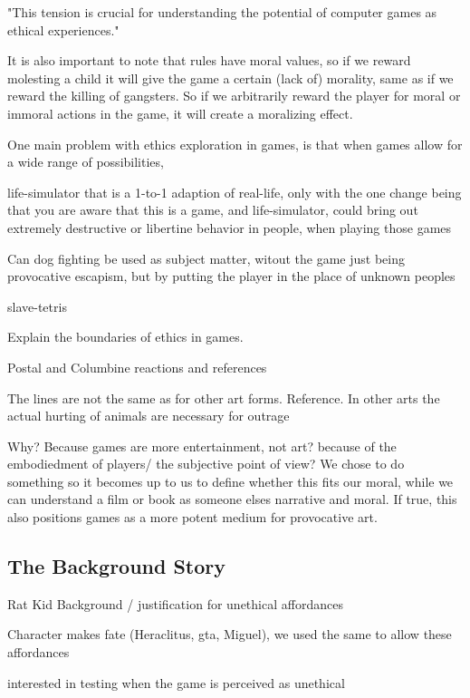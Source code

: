 "This tension is crucial for understanding the potential of computer games as ethical experiences."
\

It is also important to note that rules have moral values, so if we reward molesting a child it will give the game a certain (lack of) morality, same as if we reward the killing of gangsters. So if we arbitrarily reward the player for moral or immoral actions in the game, it will create a moralizing effect.\

One main problem with ethics exploration in games, is that when games allow for a wide range of possibilities,

life-simulator that is a 1-to-1 adaption of real-life, only with the one change being that you are aware that this is a game, and 
life-simulator, could bring out extremely destructive or libertine behavior in people, when playing those games




Can dog fighting be used as subject matter, witout the game just being provocative escapism, but by putting the player in the place of unknown peoples


slave-tetris

Explain the boundaries of ethics in games. \

Postal and Columbine reactions and references\

The lines are not the same as for other art forms. Reference. In other arts the actual hurting of animals are necessary for outrage\

Why? Because games are more entertainment, not art? because of the embodiedment of players/ the subjective point of view? We chose to do something so it becomes up to us to define whether this fits our moral, while we can understand a film or book as someone elses narrative and moral. If true, this also positions games as a more potent medium for provocative art. \ 

\subsection{The Background Story}

Rat Kid Background / justification for unethical affordances\

Character makes fate (Heraclitus, gta, Miguel), we used the same to allow these affordances \

interested in testing when the game is perceived as unethical\
